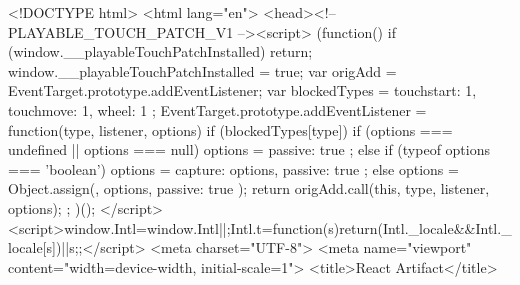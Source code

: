 <!DOCTYPE html>
<html lang="en">
<head><!-- PLAYABLE_TOUCH_PATCH_V1 --><script>
(function() {
  if (window.__playableTouchPatchInstalled) return;
  window.__playableTouchPatchInstalled = true;
  var origAdd = EventTarget.prototype.addEventListener;
  var blockedTypes = { touchstart: 1, touchmove: 1, wheel: 1 };
  EventTarget.prototype.addEventListener = function(type, listener, options) {
    if (blockedTypes[type]) {
      if (options === undefined || options === null) {
        options = { passive: true };
      } else if (typeof options === 'boolean') {
        options = { capture: options, passive: true };
      } else {
        options = Object.assign({}, options, { passive: true });
      }
    }
    return origAdd.call(this, type, listener, options);
  };
})();
</script><script>window.Intl=window.Intl||{};Intl.t=function(s){return(Intl._locale&&Intl._locale[s])||s;};</script>
  <meta charset="UTF-8">
  <meta name="viewport" content="width=device-width, initial-scale=1">
  <title>React Artifact</title>
